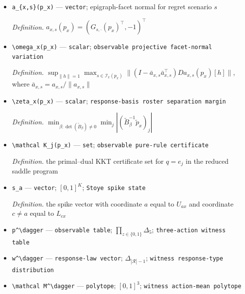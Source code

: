 \documentclass{article}
\begin{document}
\begin{itemize}
  \par\smallskip\noindent\emph{Definition.} \(\{a\in\mathcal A:q_{x,a}^*(p_x)>0\}\)
  \item \texttt{a\_\allowbreak{}\{x,\allowbreak{}s\}\allowbreak{}(p\_\allowbreak{}x)} --- \texttt{vector}; epigraph-facet normal for regret scenario \(s\)
  \par\smallskip\noindent\emph{Definition.} \(a_{x,s}(p_x)=(G_{s,\cdot}(p_x)^\top,-1)^\top\)
  \item \texttt{\textbackslash{}\allowbreak{}omega\_\allowbreak{}x(p\_\allowbreak{}x)} --- \texttt{scalar}; \texttt{observable projective facet-\allowbreak{}normal variation}
  \par\smallskip\noindent\emph{Definition.} \(\sup_{\|h\|=1}\max_{s\in\mathcal I_x(p_x)}\|(I-\bar a_{x,s}\bar a_{x,s}^\top)Da_{x,s}(p_x)[h]\|\), where \(\bar a_{x,s}=a_{x,s}/\|a_{x,s}\|\)
  \item \texttt{\textbackslash{}\allowbreak{}zeta\_\allowbreak{}x(p\_\allowbreak{}x)} --- \texttt{scalar}; \texttt{response-\allowbreak{}basis roster separation margin}
  \par\smallskip\noindent\emph{Definition.} \(\min_{\beta:\det(\widetilde B_\beta)\neq0}\min_j |(\widetilde B_\beta^{-1}\widetilde p_x)_j|\)
  \item \texttt{\textbackslash{}\allowbreak{}mathcal K\_\allowbreak{}j(p\_\allowbreak{}x)} --- \texttt{set}; \texttt{observable pure-\allowbreak{}rule certificate}
  \par\smallskip\noindent\emph{Definition.} the primal--dual KKT certificate set for \(q=e_j\) in the reduced saddle program
  \item \texttt{s\_\allowbreak{}a} --- \texttt{vector}; \([0,1]^K\); \texttt{Stoye spike state}
  \par\smallskip\noindent\emph{Definition.} the spike vector with coordinate \(a\) equal to \(U_{ax}\) and coordinate \(c\neq a\) equal to \(L_{cx}\)
  \item \texttt{p\textasciicircum{}\textbackslash{}\allowbreak{}dagger} --- \texttt{observable table}; \(\prod_{z\in\{0,1\}}\Delta_5\); \texttt{three-\allowbreak{}action witness table}
  \item \texttt{w\textasciicircum{}\textbackslash{}\allowbreak{}dagger} --- \texttt{response-\allowbreak{}law vector}; \(\Delta_{|\mathcal R|-1}\); \texttt{witness response-\allowbreak{}type distribution}
  \item \texttt{\textbackslash{}\allowbreak{}mathcal M\textasciicircum{}\textbackslash{}\allowbreak{}dagger} --- \texttt{polytope}; \([0,1]^3\); \texttt{witness action-\allowbreak{}mean polytope}

\end{itemize}
\end{document}
